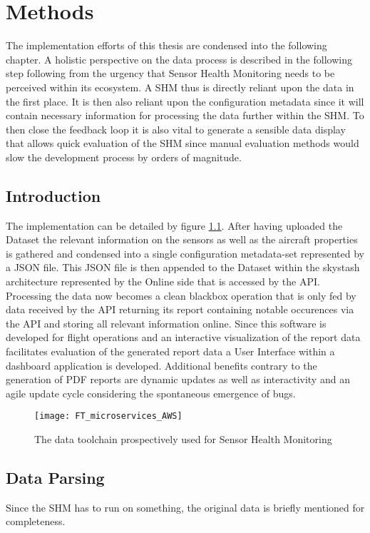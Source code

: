 \chapter{Methods}

The implementation efforts of this thesis are condensed into the following chapter. A holistic perspective on the data process is described in the following step following from the urgency that Sensor Health Monitoring needs to be perceived within its ecosystem. A SHM thus is directly reliant upon the data in the first place. It is then also reliant upon the configuration metadata since it will contain necessary information for processing the data further within the SHM. To then close the feedback loop it is also vital to generate a sensible data display that allows quick evaluation of the SHM since manual evaluation methods would slow the development process by orders of magnitude.


\section{Introduction}


The implementation can be detailed by figure \ref{fig:fti_microservices}. After having uploaded the Dataset the relevant information on the sensors as well as the aircraft properties is gathered and condensed into a single configuration metadata-set represented by a JSON file. This JSON file is then appended to the Dataset within the skystash architecture represented by the Online side that is accessed by the API. Processing the data now becomes a clean blackbox operation that is only fed by data received by the API returning its report containing notable occurences via the API and storing all relevant information online. Since this software is developed for flight operations and an interactive visualization of the report data facilitates evaluation of the generated report data a User Interface within a dashboard application is developed. Additional benefits contrary to the generation of PDF reports are dynamic updates as well as interactivity and an agile update cycle considering the spontaneous emergence of bugs.


\begin{figure}[h]
    \centering
    \texttt{[image: FT\_microservices\_AWS]}
    \caption{The data toolchain prospectively used for Sensor Health Monitoring}
    \label{fig:fti_microservices}
\end{figure}


\section{Data Parsing}
Since the SHM has to run on something, the original data is briefly mentioned for completeness.

